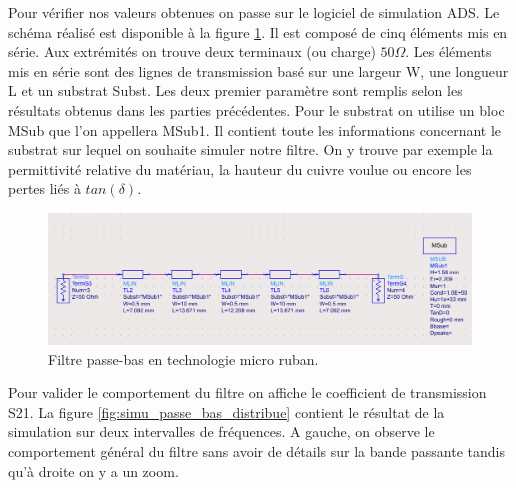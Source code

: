\documentclass[french]{article}
\begin{document}
Pour vérifier nos valeurs obtenues on passe sur le logiciel de simulation ADS. Le schéma réalisé est disponible à la figure \ref{fig:schema_distribue_passe_bas_ads}. Il est composé de cinq éléments mis en série. Aux extrémités on trouve deux terminaux (ou charge) $50\Omega$. Les éléments mis en série sont des lignes de transmission basé sur une largeur W, une longueur L et un substrat Subst. Les deux premier paramètre sont remplis selon les résultats obtenus dans les parties précédentes. Pour le substrat on utilise un bloc MSub que l'on appellera MSub1. Il contient toute les informations concernant le substrat sur lequel on souhaite simuler notre filtre. On y trouve par exemple la permittivité relative du matériau, la hauteur du cuivre voulue ou encore les pertes liés à $tan(\delta)$.

\begin{figure}[H]
	\centering
	\includegraphics[width=15cm]{photo/passe_bas_vic/schema_distribue_passe_bas_ads.png}
	\caption{Filtre passe-bas en technologie micro ruban.}
	\label{fig:schema_distribue_passe_bas_ads}
\end{figure}

Pour valider le comportement du filtre on affiche le coefficient de transmission S21. La figure \ref{fig:simu_passe_bas_distribue} contient le résultat de la simulation sur deux intervalles de fréquences. A gauche, on observe le comportement général du filtre sans avoir de détails sur la bande passante tandis qu'à droite on y a un zoom.
\end{document}
